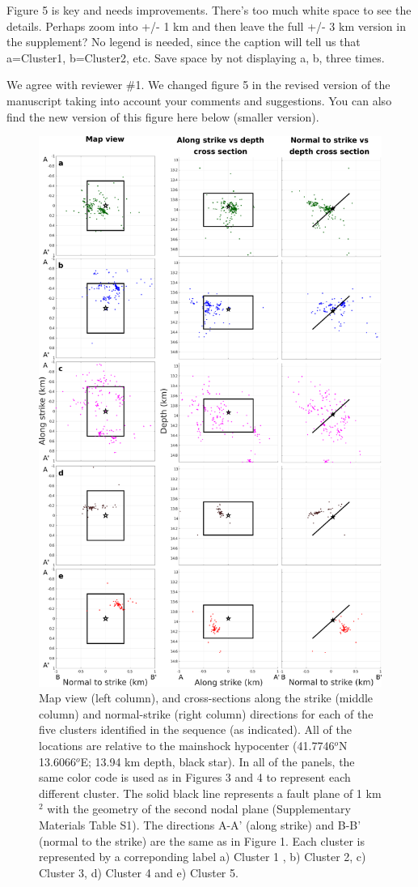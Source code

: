 \documentclass[10pt]{extarticle}
\begin{document}
\begin{ReviewerComment}{1}
\noindent 
Figure 5 is key and needs improvements. There's too much white space to see the details.  Perhaps zoom into +/- 1 km and then leave the full +/- 3 km version in the supplement? No legend is needed, since the caption will tell us that a=Cluster1, b=Cluster2, etc. Save space by not displaying a, b, three times.
\end{ReviewerComment}


\begin{Answer}
We agree with reviewer \#1. We changed figure 5 in the revised version of the manuscript taking into account your comments and suggestions. You can also find the new version of this figure here below (smaller version).
\begin{figure}[!h]
\begin{center}
 \includegraphics[width=0.7\linewidth]{maps_clusters}
\end{center}
\caption{Map view (left column), and cross-sections along the strike (middle column) and normal-strike (right column) directions for each of the five clusters identified in the sequence (as indicated). All of the locations are relative to the mainshock hypocenter (41.7746$^o$N 13.6066$^o$E; 13.94 km depth, black star). In all of the panels, the same color code is used as in Figures 3 and 4 to represent each different cluster. The solid black line represents a fault plane of 1 km$^2$ with the geometry of the second nodal plane (Supplementary Materials Table S1). The directions A-A' (along strike) and B-B' (normal to the strike) are the same as in Figure 1. Each cluster is represented by a correponding label a) Cluster 1 , b) Cluster 2, c) Cluster 3, d) Cluster 4 and e) Cluster 5.}
\label{fig:map_improved}
\end{figure}
 \WorkInProgressRevTask
\end{Answer}
%
%
\end{document}
